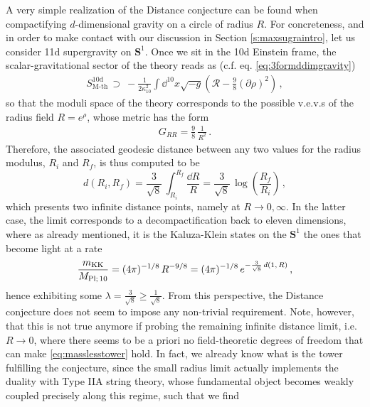 A very simple realization of the Distance conjecture can be found when compactifying $d$-dimensional gravity on a circle of radius $R$. For concreteness, and in order to make contact with our discussion in Section \ref{s:maxsugraintro}, let us consider 11d supergravity on $\mathbf{S}^1$. Once we sit in the 10d Einstein frame, the scalar-gravitational sector of the theory reads as (c.f. eq. \eqref{eq:3formddimgravity})
%
\begin{equation}
	\label{eq:scalartensorMthonS1}
	\begin{aligned}
		S^{\text{10d}}_{\text{M-th}}\, \supset\ -\frac{1}{2\kappa_{10}^2} \int \dd^{10}x\sqrt{-g} \left(\mathcal{R}-\frac{9}{8}(\partial \rho)^2\right)\, ,
	\end{aligned}
\end{equation}
%
so that the moduli space of the theory corresponds to the possible v.e.v.s of the radius field $R= e^{\rho}$, whose metric has the form
%
\begin{align}
  G_{R R} = \frac{9}{8}\, \frac{1}{R^2}\, .
\end{align}
%
Therefore, the associated geodesic distance between any two values for the radius modulus, $R_i$ and $R_f$, is thus computed to be
%
\begin{equation}
d(R_i, R_f)=  \frac{3}{\sqrt{8}}\, \int_{R_i}^{R_f} \dfrac{\dd R}{R} =  \frac{3}{\sqrt{8}}\, \log \left( \frac{R_f}{R_i} \right)\, ,
\end{equation}
%
which presents two infinite distance points, namely at $R \to 0, \infty$. In the latter case, the limit corresponds to a decompactification back to eleven dimensions, where as already mentioned, it is the Kaluza-Klein states on the $\mathbf{S}^1$ the ones that become light at a rate
%
\begin{equation}
\frac{m_{\rm KK}}{M_{\text{Pl};\, 10}}=  (4\pi)^{-1/8}\, R^{-9/8} = (4\pi)^{-1/8}\, e^{-\frac{3}{\sqrt{8}}\, d(1,\, R)}\, ,
\end{equation}
%
hence exhibiting some $\lambda = \frac{3}{\sqrt{8}} \geq \frac{1}{\sqrt{8}}$. From this perspective, the Distance conjecture does not seem to impose any non-trivial requirement. Note, however, that this is not true anymore if probing the remaining infinite distance limit, i.e. $R \to 0$, where there seems to be a priori no field-theoretic degrees of freedom that can make \eqref{eq:masslesstower} hold. In fact, we already know what is the tower fulfilling the conjecture, since the small radius limit actually implements the duality with Type IIA string theory, whose fundamental object becomes weakly coupled precisely along this regime, such that we find

